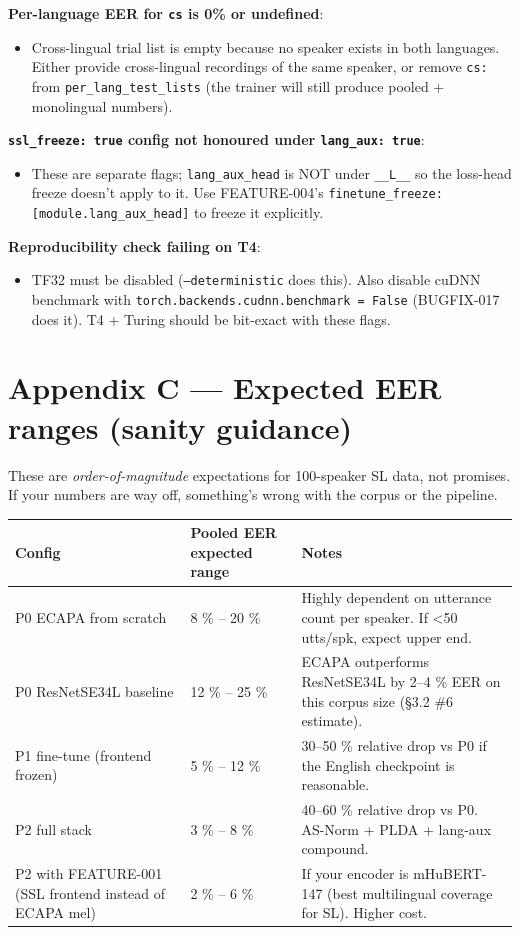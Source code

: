 \documentclass[10pt,a4paper]{article}
\renewcommand{\arraystretch}{1.15}
\begin{document}
\textbf{Per-language EER for \texttt{cs} is 0\% or undefined}:
\begin{itemize}[leftmargin=*,itemsep=2pt]
  \item Cross-lingual trial list is empty because no speaker exists in both languages. Either provide cross-lingual recordings of the same speaker, or remove \texttt{cs:} from \texttt{per\_lang\_test\_lists} (the trainer will still produce pooled + monolingual numbers).
\end{itemize}

\textbf{\texttt{ssl\_freeze: true} config not honoured under \texttt{lang\_aux: true}}:
\begin{itemize}[leftmargin=*,itemsep=2pt]
  \item These are separate flags; \texttt{lang\_aux\_head} is NOT under \texttt{\_\_L\_\_} so the loss-head freeze doesn't apply to it. Use FEATURE-004's \texttt{finetune\_freeze: [module.lang\_aux\_head]} to freeze it explicitly.
\end{itemize}

\textbf{Reproducibility check failing on T4}:
\begin{itemize}[leftmargin=*,itemsep=2pt]
  \item TF32 must be disabled (\texttt{--deterministic} does this). Also disable cuDNN benchmark with \texttt{torch.backends.cudnn.benchmark = False} (BUGFIX-017 does it). T4 + Turing should be bit-exact with these flags.
\end{itemize}

\section*{Appendix C --- Expected EER ranges (sanity guidance)}

These are \textit{order-of-magnitude} expectations for 100-speaker SL data, not promises. If your numbers are way off, something's wrong with the corpus or the pipeline.

\begin{center}
\small
\renewcommand{\arraystretch}{1.25}
\begin{tabularx}{\textwidth}{|Y|Y|Y|}
\hline
Config & Pooled EER expected range & Notes \\
\hline
P0 ECAPA from scratch & 8 \% -- 20 \% & Highly dependent on utterance count per speaker. If <50 utts/spk, expect upper end. \\
\hline
P0 ResNetSE34L baseline & 12 \% -- 25 \% & ECAPA outperforms ResNetSE34L by 2--4 \% EER on this corpus size (§3.2 \#6 estimate). \\
\hline
P1 fine-tune (frontend frozen) & 5 \% -- 12 \% & 30--50 \% relative drop vs P0 if the English checkpoint is reasonable. \\
\hline
P2 full stack & 3 \% -- 8 \% & 40--60 \% relative drop vs P0. AS-Norm + PLDA + lang-aux compound. \\
\hline
P2 with FEATURE-001 (SSL frontend instead of ECAPA mel) & 2 \% -- 6 \% & If your encoder is mHuBERT-147 (best multilingual coverage for SL). Higher cost. \\
\hline
\end{tabularx}
\end{center}
\end{document}
